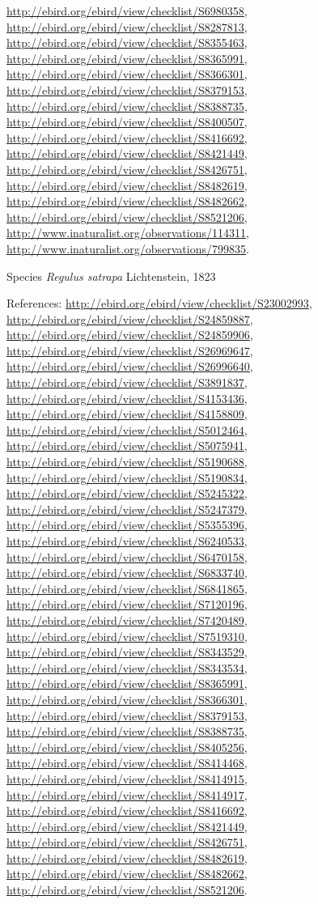 \documentclass[9pt, article]{memoir}
\begin{document}
\begin{multicols}{2}
\url{http://ebird.org/ebird/view/checklist/S6980358}, 
\url{http://ebird.org/ebird/view/checklist/S8287813}, 
\url{http://ebird.org/ebird/view/checklist/S8355463}, 
\url{http://ebird.org/ebird/view/checklist/S8365991}, 
\url{http://ebird.org/ebird/view/checklist/S8366301}, 
\url{http://ebird.org/ebird/view/checklist/S8379153}, 
\url{http://ebird.org/ebird/view/checklist/S8388735}, 
\url{http://ebird.org/ebird/view/checklist/S8400507}, 
\url{http://ebird.org/ebird/view/checklist/S8416692}, 
\url{http://ebird.org/ebird/view/checklist/S8421449}, 
\url{http://ebird.org/ebird/view/checklist/S8426751}, 
\url{http://ebird.org/ebird/view/checklist/S8482619}, 
\url{http://ebird.org/ebird/view/checklist/S8482662}, 
\url{http://ebird.org/ebird/view/checklist/S8521206}, 
\url{http://www.inaturalist.org/observations/114311}, 
\url{http://www.inaturalist.org/observations/799835}.

\vspace{6pt}\noindent\hspace{36pt}Species \textit{Regulus satrapa} Lichtenstein, 1823


\vspace{6pt}References: 
\url{http://ebird.org/ebird/view/checklist/S23002993}, 
\url{http://ebird.org/ebird/view/checklist/S24859887}, 
\url{http://ebird.org/ebird/view/checklist/S24859906}, 
\url{http://ebird.org/ebird/view/checklist/S26969647}, 
\url{http://ebird.org/ebird/view/checklist/S26996640}, 
\url{http://ebird.org/ebird/view/checklist/S3891837}, 
\url{http://ebird.org/ebird/view/checklist/S4153436}, 
\url{http://ebird.org/ebird/view/checklist/S4158809}, 
\url{http://ebird.org/ebird/view/checklist/S5012464}, 
\url{http://ebird.org/ebird/view/checklist/S5075941}, 
\url{http://ebird.org/ebird/view/checklist/S5190688}, 
\url{http://ebird.org/ebird/view/checklist/S5190834}, 
\url{http://ebird.org/ebird/view/checklist/S5245322}, 
\url{http://ebird.org/ebird/view/checklist/S5247379}, 
\url{http://ebird.org/ebird/view/checklist/S5355396}, 
\url{http://ebird.org/ebird/view/checklist/S6240533}, 
\url{http://ebird.org/ebird/view/checklist/S6470158}, 
\url{http://ebird.org/ebird/view/checklist/S6833740}, 
\url{http://ebird.org/ebird/view/checklist/S6841865}, 
\url{http://ebird.org/ebird/view/checklist/S7120196}, 
\url{http://ebird.org/ebird/view/checklist/S7420489}, 
\url{http://ebird.org/ebird/view/checklist/S7519310}, 
\url{http://ebird.org/ebird/view/checklist/S8343529}, 
\url{http://ebird.org/ebird/view/checklist/S8343534}, 
\url{http://ebird.org/ebird/view/checklist/S8365991}, 
\url{http://ebird.org/ebird/view/checklist/S8366301}, 
\url{http://ebird.org/ebird/view/checklist/S8379153}, 
\url{http://ebird.org/ebird/view/checklist/S8388735}, 
\url{http://ebird.org/ebird/view/checklist/S8405256}, 
\url{http://ebird.org/ebird/view/checklist/S8414468}, 
\url{http://ebird.org/ebird/view/checklist/S8414915}, 
\url{http://ebird.org/ebird/view/checklist/S8414917}, 
\url{http://ebird.org/ebird/view/checklist/S8416692}, 
\url{http://ebird.org/ebird/view/checklist/S8421449}, 
\url{http://ebird.org/ebird/view/checklist/S8426751}, 
\url{http://ebird.org/ebird/view/checklist/S8482619}, 
\url{http://ebird.org/ebird/view/checklist/S8482662}, 
\url{http://ebird.org/ebird/view/checklist/S8521206}.


\end{multicols}
\end{document}
